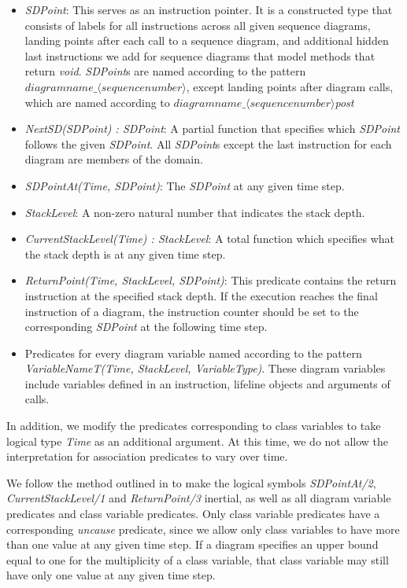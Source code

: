 \documentclass[conference]{IEEEtran}
\begin{document}
\begin{itemize}
	\item \textit{SDPoint}: This serves as an instruction pointer. It is a constructed type that consists of labels for all instructions across all given sequence diagrams, landing points after each call to a sequence diagram, and additional hidden last instructions we add for sequence diagrams that model methods that return \textit{void}. \textit{SDPoint}s are named according to the pattern \textit{$diagramname\_\langle{}sequencenumber\rangle$}, except landing points after diagram calls, which are named according to \textit{$diagramname\_\langle{}sequencenumber\rangle$post}
	\item \textit{NextSD(SDPoint) : SDPoint}: A partial function that specifies which \textit{SDPoint} follows the given \textit{SDPoint}. All \textit{SDPoint}s except the last instruction for each diagram are members of the domain.
	\item \textit{SDPointAt(Time, SDPoint)}: The \textit{SDPoint} at any given time step.
	\item \textit{StackLevel}: A non-zero natural number that indicates the stack depth.
	\item \textit{CurrentStackLevel(Time) : StackLevel}: A total function which specifies what the stack depth is at any given time step.
	\item \textit{ReturnPoint(Time, StackLevel, SDPoint)}: This predicate contains the return instruction at the specified stack depth. If the execution reaches the final instruction of a diagram, the instruction counter should be set to the corresponding \textit{SDPoint} at the following time step.
	\item Predicates for every diagram variable named according to the pattern \textit{VariableNameT(Time, StackLevel, VariableType)}. These diagram variables include variables defined in an instruction, lifeline objects and arguments of calls.
\end{itemize}

In addition, we modify the predicates corresponding to class variables to take logical type \textit{Time} as an additional argument. At this time, we do not allow the interpretation for association predicates to vary over time.

We follow the method outlined in \cite{BogaertsBart2014Sdsu} to make the logical symbols \textit{SDPointAt/2}, \textit{CurrentStackLevel/1} and \textit{ReturnPoint/3} inertial, as well as all diagram variable predicates and class variable predicates. Only class variable predicates have a corresponding \textit{uncause} predicate, since we allow only class variables to have more than one value at any given time step. If a diagram specifies an upper bound equal to one for the multiplicity of a class variable, that class variable may still have only one value at any given time step.
\end{document}
